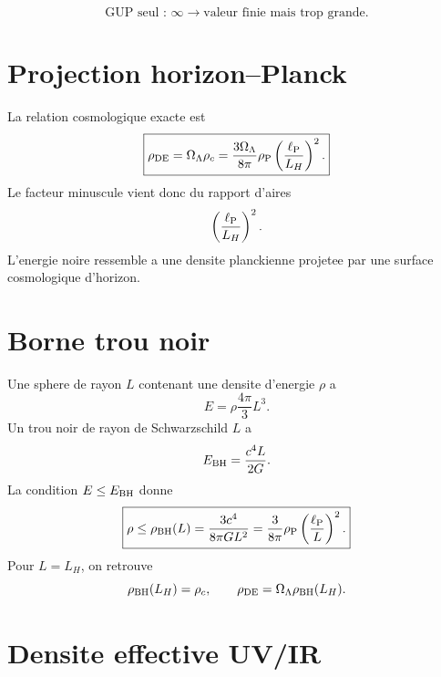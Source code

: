 \documentclass[11pt,a4paper]{article}
\newcommand{\rhoP}{\rho_{\rm P}}
\newcommand{\ellP}{\ell_{\rm P}}
\newcommand{\rhoDE}{\rho_{\rm DE}}
\newcommand{\rhoBH}{\rho_{\rm BH}}
\newcommand{\LH}{L_H}
\begin{document}
\begin{equation}
\boxed{
\text{GUP seul : }\infty\longrightarrow \text{valeur finie mais trop grande.}
}
\end{equation}

\section{Projection horizon--Planck}

La relation cosmologique exacte est
\begin{equation}
\boxed{
\rhoDE
=
\Omega_\Lambda\rho_c
=
\frac{3\Omega_\Lambda}{8\pi}\rhoP
\left(\frac{\ellP}{\LH}\right)^2.
}
\label{eq:rho_de_uvir}
\end{equation}
Le facteur minuscule vient donc du rapport d'aires
\begin{equation}
\left(\frac{\ellP}{\LH}\right)^2.
\end{equation}
L'energie noire ressemble a une densite planckienne projetee par une surface
cosmologique d'horizon.

\section{Borne trou noir}

Une sphere de rayon $L$ contenant une densite d'energie $\rho$ a
\begin{equation}
E=\rho\frac{4\pi}{3}L^3.
\end{equation}
Un trou noir de rayon de Schwarzschild $L$ a
\begin{equation}
E_{\rm BH}=\frac{c^4L}{2G}.
\end{equation}
La condition $E\leq E_{\rm BH}$ donne
\begin{equation}
\boxed{
\rho\leq\rhoBH(L)=\frac{3c^4}{8\pi GL^2}
=
\frac{3}{8\pi}\rhoP\left(\frac{\ellP}{L}\right)^2.
}
\label{eq:rho_bh}
\end{equation}
Pour $L=\LH$, on retrouve
\begin{equation}
\rhoBH(\LH)=\rho_c,
\qquad
\rhoDE=\Omega_\Lambda\rhoBH(\LH).
\end{equation}

\section{Densite effective UV/IR}
\end{document}
